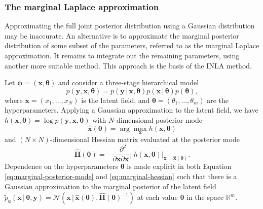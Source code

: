\documentclass[a4paper, nobind]{templates/ociamthesis}
\begin{document}
\hypertarget{marginal-la}{%
\subsubsection{The marginal Laplace approximation}\label{marginal-la}}

Approximating the full joint posterior distribution using a Gaussian distribution may be inaccurate.
An alternative is to approximate the marginal posterior distribution of some subset of the parameters, referred to as the marginal Laplace approximation.
It remains to integrate out the remaining parameters, using another more suitable method.
This approach is the basis of the INLA method.

Let \(\boldsymbol{\mathbf{\phi}} = (\mathbf{x}, \boldsymbol{\mathbf{\theta}})\) and consider a three-stage hierarchical model
\begin{equation}
p(\mathbf{y}, \mathbf{x}, \boldsymbol{\mathbf{\theta}}) = p(\mathbf{y} \, | \, \mathbf{x}, \boldsymbol{\mathbf{\theta}}) p(\mathbf{x} \, | \, \boldsymbol{\mathbf{\theta}}) p(\boldsymbol{\mathbf{\theta}}),
\end{equation}
where \(\mathbf{x} = (x_1, \ldots, x_N)\) is the latent field, and \(\boldsymbol{\mathbf{\theta}} = (\theta_1, \ldots, \theta_m)\) are the hyperparameters.
Applying a Gaussian approximation to the latent field, we have \(h(\mathbf{x}, \boldsymbol{\mathbf{\theta}}) = \log p(\mathbf{y}, \mathbf{x}, \boldsymbol{\mathbf{\theta}})\) with \(N\)-dimensional posterior mode
\begin{equation}
\hat{\mathbf{x}}(\boldsymbol{\mathbf{\theta}}) = \arg\max_{\mathbf{x}} h(\mathbf{x}, \boldsymbol{\mathbf{\theta}}) \label{eq:marginal-posterior-mode}
\end{equation}
and \((N \times N)\)-dimensional Hessian matrix evaluated at the posterior mode
\begin{equation}
\hat {\mathbf{H}}(\boldsymbol{\mathbf{\theta}}) = - \frac{\partial^2}{\partial \mathbf{x} \partial \mathbf{x}^\top} h(\mathbf{x}, \boldsymbol{\mathbf{\theta}}) \rvert_{\mathbf{x} = \hat{\mathbf{x}}(\boldsymbol{\mathbf{\theta}})}. \label{eq:marginal-hessian}
\end{equation}
Dependence on the hyperparameters \(\boldsymbol{\mathbf{\theta}}\) is made explicit in both Equation \eqref{eq:marginal-posterior-mode} and \eqref{eq:marginal-hessian} such that there is a Gaussian approximation to the marginal posterior of the latent field \(\tilde p_\texttt{G}(\mathbf{x} \, | \, \boldsymbol{\mathbf{\theta}}, \mathbf{y}) = \mathcal{N}(\mathbf{x} \, | \, \hat{\mathbf{x}}(\boldsymbol{\mathbf{\theta}}), \hat{\mathbf{H}}(\boldsymbol{\mathbf{\theta}})^{-1})\) at each value \(\boldsymbol{\mathbf{\theta}}\) in the space \(\mathbb{R}^m\).
\end{document}
